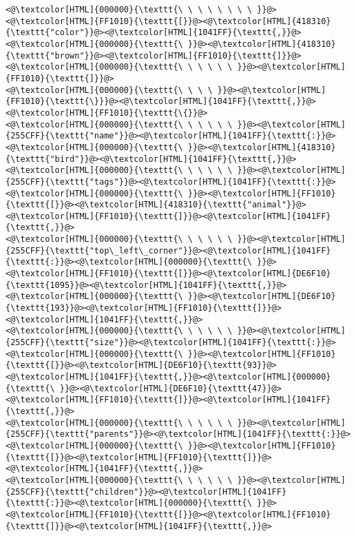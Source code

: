 \begin{lstlisting}
<@\textcolor[HTML]{000000}{\texttt{\ \ \ \ \ \ \ \ }}@><@\textcolor[HTML]{FF1010}{\texttt{[}}@><@\textcolor[HTML]{418310}{\texttt{"color"}}@><@\textcolor[HTML]{1041FF}{\texttt{,}}@><@\textcolor[HTML]{000000}{\texttt{\ }}@><@\textcolor[HTML]{418310}{\texttt{"brown"}}@><@\textcolor[HTML]{FF1010}{\texttt{]}}@>
<@\textcolor[HTML]{000000}{\texttt{\ \ \ \ \ \ }}@><@\textcolor[HTML]{FF1010}{\texttt{]}}@>
<@\textcolor[HTML]{000000}{\texttt{\ \ \ \ }}@><@\textcolor[HTML]{FF1010}{\texttt{\}}}@><@\textcolor[HTML]{1041FF}{\texttt{,}}@> <@\textcolor[HTML]{FF1010}{\texttt{\{}}@>
<@\textcolor[HTML]{000000}{\texttt{\ \ \ \ \ \ }}@><@\textcolor[HTML]{255CFF}{\texttt{"name"}}@><@\textcolor[HTML]{1041FF}{\texttt{:}}@><@\textcolor[HTML]{000000}{\texttt{\ }}@><@\textcolor[HTML]{418310}{\texttt{"bird"}}@><@\textcolor[HTML]{1041FF}{\texttt{,}}@>
<@\textcolor[HTML]{000000}{\texttt{\ \ \ \ \ \ }}@><@\textcolor[HTML]{255CFF}{\texttt{"tags"}}@><@\textcolor[HTML]{1041FF}{\texttt{:}}@><@\textcolor[HTML]{000000}{\texttt{\ }}@><@\textcolor[HTML]{FF1010}{\texttt{[}}@><@\textcolor[HTML]{418310}{\texttt{"animal"}}@><@\textcolor[HTML]{FF1010}{\texttt{]}}@><@\textcolor[HTML]{1041FF}{\texttt{,}}@>
<@\textcolor[HTML]{000000}{\texttt{\ \ \ \ \ \ }}@><@\textcolor[HTML]{255CFF}{\texttt{"top\_left\_corner"}}@><@\textcolor[HTML]{1041FF}{\texttt{:}}@><@\textcolor[HTML]{000000}{\texttt{\ }}@><@\textcolor[HTML]{FF1010}{\texttt{[}}@><@\textcolor[HTML]{DE6F10}{\texttt{1095}}@><@\textcolor[HTML]{1041FF}{\texttt{,}}@><@\textcolor[HTML]{000000}{\texttt{\ }}@><@\textcolor[HTML]{DE6F10}{\texttt{193}}@><@\textcolor[HTML]{FF1010}{\texttt{]}}@><@\textcolor[HTML]{1041FF}{\texttt{,}}@>
<@\textcolor[HTML]{000000}{\texttt{\ \ \ \ \ \ }}@><@\textcolor[HTML]{255CFF}{\texttt{"size"}}@><@\textcolor[HTML]{1041FF}{\texttt{:}}@><@\textcolor[HTML]{000000}{\texttt{\ }}@><@\textcolor[HTML]{FF1010}{\texttt{[}}@><@\textcolor[HTML]{DE6F10}{\texttt{93}}@><@\textcolor[HTML]{1041FF}{\texttt{,}}@><@\textcolor[HTML]{000000}{\texttt{\ }}@><@\textcolor[HTML]{DE6F10}{\texttt{47}}@><@\textcolor[HTML]{FF1010}{\texttt{]}}@><@\textcolor[HTML]{1041FF}{\texttt{,}}@>
<@\textcolor[HTML]{000000}{\texttt{\ \ \ \ \ \ }}@><@\textcolor[HTML]{255CFF}{\texttt{"parents"}}@><@\textcolor[HTML]{1041FF}{\texttt{:}}@><@\textcolor[HTML]{000000}{\texttt{\ }}@><@\textcolor[HTML]{FF1010}{\texttt{[}}@><@\textcolor[HTML]{FF1010}{\texttt{]}}@><@\textcolor[HTML]{1041FF}{\texttt{,}}@>
<@\textcolor[HTML]{000000}{\texttt{\ \ \ \ \ \ }}@><@\textcolor[HTML]{255CFF}{\texttt{"children"}}@><@\textcolor[HTML]{1041FF}{\texttt{:}}@><@\textcolor[HTML]{000000}{\texttt{\ }}@><@\textcolor[HTML]{FF1010}{\texttt{[}}@><@\textcolor[HTML]{FF1010}{\texttt{]}}@><@\textcolor[HTML]{1041FF}{\texttt{,}}@>

\end{lstlisting}

